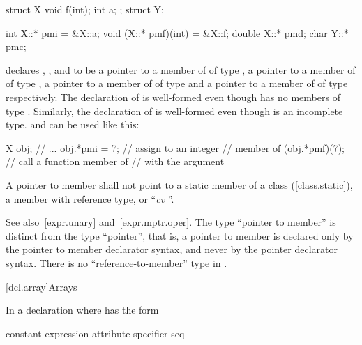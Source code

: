 \pnum
\enterexample%

\begin{codeblock}
struct X {
  void f(int);
  int a;
};
struct Y;

int X::* pmi = &X::a;
void (X::* pmf)(int) = &X::f;
double X::* pmd;
char Y::* pmc;
\end{codeblock}

declares
,
,
and
to be a pointer to a member of
of type
,
a pointer to a member of
of type
,
a pointer to a member of
of type
and a pointer to a member of
of type
respectively.
The declaration of
is well-formed even though
has no members of type
.
Similarly, the declaration of
is well-formed even though
is an incomplete type.
and
can be used like this:

\begin{codeblock}
X obj;
// ...
obj.*pmi = 7;       // assign  to an integer
                    // member of 
(obj.*pmf)(7);      // call a function member of 
                    // with the argument 
\end{codeblock}
\exitexample

\pnum
A pointer to member shall not point to a static member
of a class (\ref{class.static}),
a member with reference type,
or
``\textit{cv}
''.

\enternote
See also~\ref{expr.unary} and~\ref{expr.mptr.oper}.
The type ``pointer to member'' is distinct from the type ``pointer'',
that is, a pointer to member is declared only by the pointer to member
declarator syntax, and never by the pointer declarator syntax.
There is no ``reference-to-member'' type in \Cpp.
\exitnote

[dcl.array]{Arrays}%

\pnum
In a declaration
where
has the form

\begin{ncsimplebnf}
\terminal{D1 [} constant-expression\opt \terminal{]} attribute-specifier-seq\opt
\end{ncsimplebnf}

